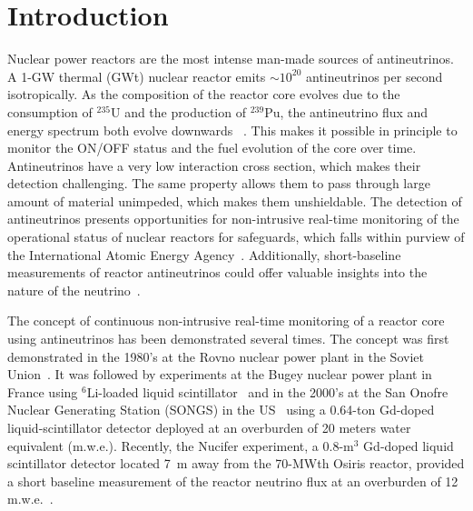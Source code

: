 \documentclass[final,5p,times,twocolumn]{elsarticle}
\begin{document}

\section{Introduction}


Nuclear power reactors are the most intense man-made sources of antineutrinos. 
A 1-GW thermal (GWt) nuclear reactor emits $\sim10^{20}$ antineutrinos per second isotropically. As the composition of the reactor core evolves due to the consumption of $^{235}$U and the production of $^{239}$Pu, the antineutrino flux and energy spectrum both evolve downwards ~\cite{Bowden:2006hu}. This makes it possible in principle to monitor the ON/OFF status and the fuel evolution of the core over time.
Antineutrinos have a very low interaction cross section, which makes their detection challenging. The same property allows them to pass through large amount of material unimpeded, which makes them unshieldable. 
The detection of antineutrinos presents opportunities for non-intrusive real-time monitoring of the operational status of nuclear reactors for safeguards, which falls within purview of the International Atomic Energy Agency~\cite{Bernstein2010,bernstein_rmp2020}. 
Additionally, short-baseline measurements of reactor antineutrinos could offer valuable insights into the nature of the neutrino~\cite{prospect2019,buck2017,Qian_2019,BOSER2019103736}.

The concept of continuous non-intrusive real-time monitoring of a reactor core using antineutrinos has been demonstrated several times. The concept was first demonstrated in the 1980's at the Rovno nuclear power plant in the Soviet Union~\cite{Korovkin1984,rovno1994}. It was followed by experiments at the Bugey nuclear power plant in France using $^6$Li-loaded liquid scintillator~\cite{CAVAIGNAC1984387,Bugey_direction} and in the 2000's at the San Onofre Nuclear Generating Station (SONGS) in the US~\cite{Bowden_ev} using a 0.64-ton Gd-doped liquid-scintillator detector deployed at an overburden of 20 meters water equivalent (m.w.e.). Recently, the Nucifer experiment, a 0.8-m$^3$ Gd-doped liquid scintillator detector located 7~m away from the 70-MWth Osiris reactor, provided a short baseline measurement of the reactor neutrino flux at an overburden of 12 m.w.e.~\cite{Boireau:2015dda}. 
\end{document}
